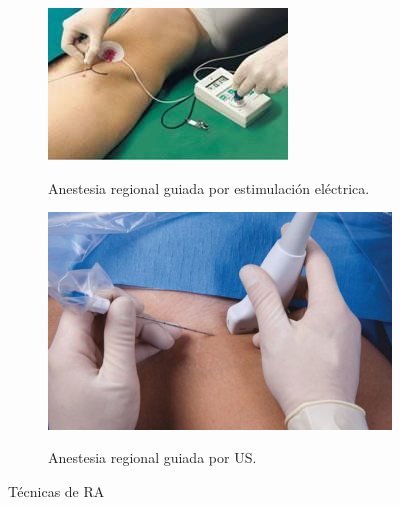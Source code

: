 \begin{figure}[h]
   \begin{subfigure}[b]{0.45\linewidth}
        \centering
        {\includegraphics[width=\linewidth]{IMG/electrical.png}}
        \caption{\label{fig:electrical}Anestesia regional guiada por estimulación eléctrica.}
    \end{subfigure}
    \null\hfill
     \begin{subfigure}[b]{0.45\linewidth}
        \centering
        {\includegraphics[width=\linewidth]{IMG/RAUS.png}}
        \caption{\label{fig:raus}Anestesia regional guiada por \acl{US}.}
    \end{subfigure}
     
    \caption{Técnicas de \acl{RA}}
   \end{figure}
   
